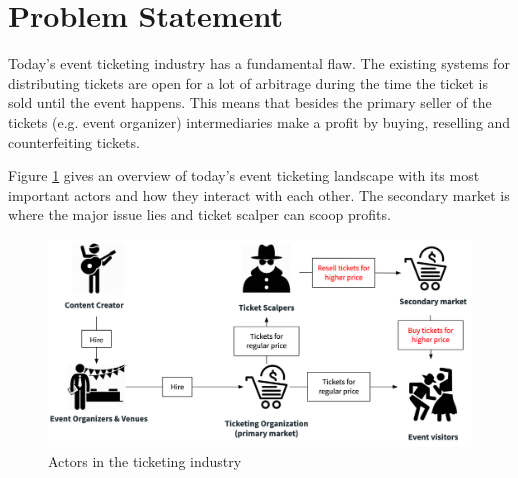 \section{Problem Statement}
Today's event ticketing industry has a fundamental flaw. The existing systems for distributing tickets are open for a lot of arbitrage during the time the ticket is sold until the event happens. This means that besides the primary seller of the tickets (e.g. event organizer) intermediaries make a profit by buying, reselling and counterfeiting tickets. 

Figure \ref{fig:ticketing-industry-landscape} gives an overview of today's event ticketing landscape with its most important actors and how they interact with each other. The secondary market is where the major issue lies and ticket scalper can scoop profits.

\begin{figure}[H]
    \centering
    \includegraphics[width=16cm]{figures/ticketing-industry-landscape.png}
    \caption{Actors in the ticketing industry}
    \label{fig:ticketing-industry-landscape}
\end{figure}


